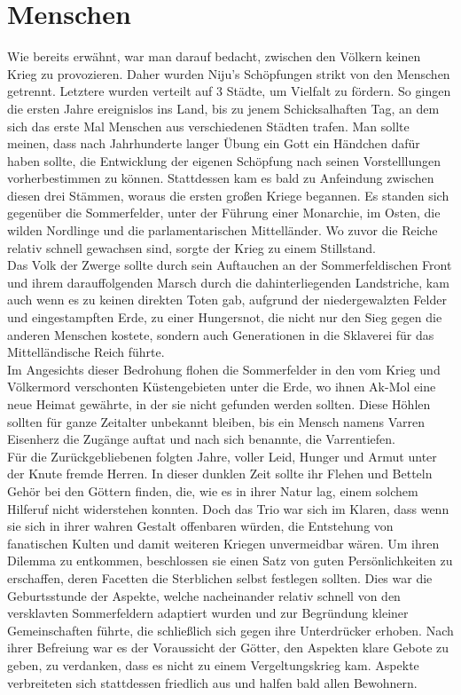 \documentclass[a4paper,12pt,oneside]{book}
\begin{document}
\section{Menschen}
Wie bereits erwähnt, war man darauf bedacht, zwischen den Völkern keinen Krieg zu provozieren. Daher wurden Niju's Schöpfungen strikt von den Menschen getrennt. Letztere wurden verteilt auf 3 Städte, um Vielfalt zu fördern. So gingen die ersten Jahre ereignislos ins Land, bis zu jenem Schicksalhaften Tag, an dem sich das erste Mal Menschen aus verschiedenen Städten trafen. Man sollte meinen, dass nach Jahrhunderte langer Übung ein Gott ein Händchen dafür haben sollte, die Entwicklung der eigenen Schöpfung nach seinen Vorstelllungen vorherbestimmen zu können. Stattdessen kam es bald zu Anfeindung zwischen diesen drei Stämmen, woraus die ersten großen Kriege begannen. Es standen sich gegenüber die Sommerfelder, unter der Führung einer Monarchie, im Osten, die wilden Nordlinge und die parlamentarischen Mittelländer. Wo zuvor die Reiche relativ schnell gewachsen sind, sorgte der Krieg zu einem Stillstand.
\\Das Volk der Zwerge sollte durch sein Auftauchen an der Sommerfeldischen Front und ihrem darauffolgenden Marsch durch die dahinterliegenden Landstriche, kam auch wenn es zu keinen direkten Toten gab, aufgrund der niedergewalzten Felder und eingestampften Erde, zu einer Hungersnot, die nicht nur den Sieg gegen die anderen Menschen kostete, sondern auch Generationen in die Sklaverei für das Mittelländische Reich führte.
\\Im Angesichts dieser Bedrohung flohen die Sommerfelder in den vom Krieg und Völkermord verschonten Küstengebieten unter die Erde, wo ihnen Ak-Mol eine neue Heimat gewährte, in der sie nicht gefunden werden sollten. Diese Höhlen sollten für ganze Zeitalter unbekannt bleiben, bis ein Mensch namens Varren Eisenherz die Zugänge auftat und nach sich benannte, die Varrentiefen. 
\\Für die Zurückgebliebenen folgten Jahre, voller Leid, Hunger und Armut unter der Knute fremde Herren. In dieser dunklen Zeit sollte ihr Flehen und Betteln Gehör bei den Göttern finden, die, wie es in ihrer Natur lag, einem solchem Hilferuf nicht widerstehen konnten. Doch das Trio war sich im Klaren, dass wenn sie sich in ihrer wahren Gestalt offenbaren würden, die Entstehung von fanatischen Kulten und damit weiteren Kriegen unvermeidbar wären. Um ihren Dilemma zu entkommen, beschlossen sie einen Satz von guten Persönlichkeiten zu erschaffen, deren Facetten die Sterblichen selbst festlegen sollten. Dies war die Geburtsstunde der Aspekte, welche nacheinander relativ schnell von den versklavten Sommerfeldern adaptiert wurden und zur Begründung kleiner Gemeinschaften führte, die schließlich sich gegen ihre Unterdrücker erhoben. Nach ihrer Befreiung war es der Voraussicht der Götter, den Aspekten klare Gebote zu geben, zu verdanken, dass es nicht zu einem Vergeltungskrieg kam. Aspekte verbreiteten sich stattdessen friedlich aus und halfen bald allen Bewohnern. 
\end{document}
